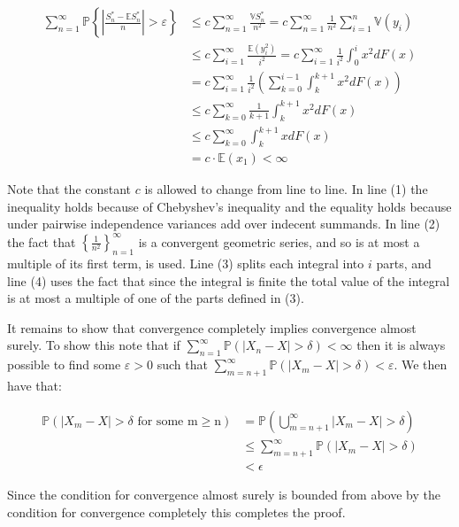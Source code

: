 \documentclass[11pt]{article}\usepackage[utf8]{inputenc}
\begin{document}
\begin{align}
    \sum_{n=1}^{\infty} \mathbb{P} \left \{ \left | \frac{S_n^* - \mathbb{E}S_n^*}{n} \right | > \varepsilon \right \}  &\leq c \sum_{n=1}^{\infty} \frac{\mathbb{V}S_n^*}{n^2} = c \sum_{n=1}^{\infty}\frac{1}{n^2} \sum_{i=1}^{n} \mathbb{V}(y_i) \\
    & \leq c \sum_{i=1}^{\infty} \frac{\mathbb{E}(y_i^2)}{i^2} = c \sum_{i=1}^{\infty}\frac{1}{i^2} \int_{0}^{i}x^2dF(x) \\
    & = c \sum_{i=1}^{\infty} \frac{1}{i^2} \left ( \sum_{k=0}^{i-1} \int_{k}^{k+1}x^2dF(x) \right ) \\ 
    & \leq c \sum_{k=0}^{\infty} \frac{1}{k+1} \int_{k}^{k+1}x^2dF(x) \\ 
    & \leq c \sum_{k=0}^\infty \int_k^{k+1}xdF(x) \\ 
    & = c \cdot \mathbb{E}(x_1) < \infty
\end{align}

Note that the constant $c$ is allowed to change from line to line. In line (1) the inequality holds because of Chebyshev's inequality and the equality holds because under pairwise independence variances add over indecent summands. In line (2) the fact that $\left \{ \frac{1}{n^2} \right \}_{n=1}^\infty$ is a convergent geometric series, and so is at most a  multiple of its first term, is used. Line (3) splits each integral into $i$ parts, and line (4) uses the fact that since the integral is finite the total value of the integral is at most a multiple of one of the parts defined in (3). 

It remains to show that convergence completely implies convergence almost surely. To show this note that if $\sum_{n=1}^{\infty} \mathbb{P}(|X_n - X| > \delta ) < \infty $ then it is always possible to find some $\varepsilon > 0$ such that $\sum_{m=n+1}^{\infty} \mathbb{P}(|X_m - X| > \delta ) < \varepsilon$. We then have that: 

\begin{align*}
    \mathbb{P}\left ( \left | X_m - X \right | > \delta \text{ for some m}\geq\text{n} \right ) &= \mathbb{P} \left ( \bigcup_{m=n+1}^{\infty} \left | X_m - X \right | > \delta  \right )\\ 
    & \leq \sum_{m=n+1}^{\infty} \mathbb{P}\left ( \left | X_m - X \right | > \delta \right ) \\ 
    & < \epsilon
\end{align*}

Since the condition for convergence almost surely is bounded from above by the condition for convergence completely this completes the proof. 
\end{document}
